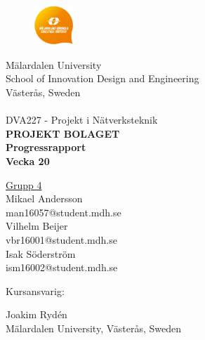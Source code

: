 
\begin{center}
		\begin{figure}[t]	
				\includegraphics[width=15mm, viewport=0 0 100 100]{MDHlogga.png}
		\end{figure}
                 	\Large M\"{a}lardalen University \\
			\Large School of Innovation Design and Engineering \\
                        \Large V\"{a}ster\r{a}s, Sweden\\

                        \noindent\makebox[\linewidth]{\rule{\textwidth}{0.4pt}}\\[0.5cm]
                
                \Large {DVA227 - Projekt i Nätverksteknik}\\[1.0cm]

			\huge \textbf{\uppercase{Projekt Bolaget}} \\ [1.0cm] %
            \LARGE \textbf{Progressrapport \\Vecka 20 }
				
			\LARGE \underline{Grupp 4}\\
			\LARGE Mikael Andersson  \\
            \large man16057@student.mdh.se \\[0.7cm]
            \LARGE Vilhelm Beijer   \\
            \large vbr16001@student.mdh.se \\[0.7cm]
            \LARGE Isak Söderström   \\
            \large ism16002@student.mdh.se \\[0.7cm]	

\begin{flushleft}
 			\Large \hspace{0.04cm} Kursansvarig:  \begin{minipage}[t]{0,7\textwidth}\Large  Joakim Rydén\\
			\large Mälardalen University, \large Västerås, Sweden\\ \end{minipage}\\[0.5cm]
			

\end{flushleft}
\end{center}
